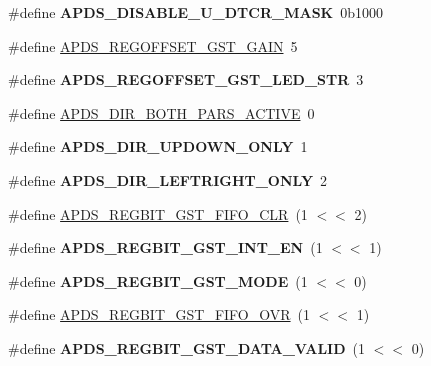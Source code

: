 \begin{DoxyCompactItemize}
\#define {\bfseries A\+P\+D\+S\+\_\+\+D\+I\+S\+A\+B\+L\+E\+\_\+\+U\+\_\+\+D\+T\+C\+R\+\_\+\+M\+A\+SK}~0b1000
\item 
\#define \hyperlink{group__APDS9960__FunctionDefines_ga6a4a918ea439ba1292d921a78922aab6}{A\+P\+D\+S\+\_\+\+R\+E\+G\+O\+F\+F\+S\+E\+T\+\_\+\+G\+S\+T\+\_\+\+G\+A\+IN}~5
\item 
\mbox{\label{group__APDS9960__FunctionDefines_ga9505535eeeeb9480009a8adc7eae230a}} 
\#define {\bfseries A\+P\+D\+S\+\_\+\+R\+E\+G\+O\+F\+F\+S\+E\+T\+\_\+\+G\+S\+T\+\_\+\+L\+E\+D\+\_\+\+S\+TR}~3
\item 
\#define \hyperlink{group__APDS9960__FunctionDefines_ga53f8093b8ea12a7e143b39e809015df2}{A\+P\+D\+S\+\_\+\+D\+I\+R\+\_\+\+B\+O\+T\+H\+\_\+\+P\+A\+R\+S\+\_\+\+A\+C\+T\+I\+VE}~0
\item 
\mbox{\label{group__APDS9960__FunctionDefines_ga60b136e0e23e8247b9f5d92bed615c0c}} 
\#define {\bfseries A\+P\+D\+S\+\_\+\+D\+I\+R\+\_\+\+U\+P\+D\+O\+W\+N\+\_\+\+O\+N\+LY}~1
\item 
\mbox{\label{group__APDS9960__FunctionDefines_gaed85f3891cca3b53f27efd64db56864c}} 
\#define {\bfseries A\+P\+D\+S\+\_\+\+D\+I\+R\+\_\+\+L\+E\+F\+T\+R\+I\+G\+H\+T\+\_\+\+O\+N\+LY}~2
\item 
\#define \hyperlink{group__APDS9960__FunctionDefines_ga6c29c17999e9beb174fb1d124ca6da30}{A\+P\+D\+S\+\_\+\+R\+E\+G\+B\+I\+T\+\_\+\+G\+S\+T\+\_\+\+F\+I\+F\+O\+\_\+\+C\+LR}~(1 $<$$<$ 2)
\item 
\mbox{\label{group__APDS9960__FunctionDefines_ga0f2b19f5005e0d9949e79335641efa0d}} 
\#define {\bfseries A\+P\+D\+S\+\_\+\+R\+E\+G\+B\+I\+T\+\_\+\+G\+S\+T\+\_\+\+I\+N\+T\+\_\+\+EN}~(1 $<$$<$ 1)
\item 
\mbox{\label{group__APDS9960__FunctionDefines_ga9b857adf9fea2c1c551eef698e3af5b0}} 
\#define {\bfseries A\+P\+D\+S\+\_\+\+R\+E\+G\+B\+I\+T\+\_\+\+G\+S\+T\+\_\+\+M\+O\+DE}~(1 $<$$<$ 0)
\item 
\#define \hyperlink{group__APDS9960__FunctionDefines_ga9d7d340f2d4ccfdd54ee1c75f7d28050}{A\+P\+D\+S\+\_\+\+R\+E\+G\+B\+I\+T\+\_\+\+G\+S\+T\+\_\+\+F\+I\+F\+O\+\_\+\+O\+VR}~(1 $<$$<$ 1)
\item 
\mbox{\label{group__APDS9960__FunctionDefines_ga3f264320d080117d991c9fccc98adc23}} 
\#define {\bfseries A\+P\+D\+S\+\_\+\+R\+E\+G\+B\+I\+T\+\_\+\+G\+S\+T\+\_\+\+D\+A\+T\+A\+\_\+\+V\+A\+L\+ID}~(1 $<$$<$ 0)
\end{DoxyCompactItemize}



